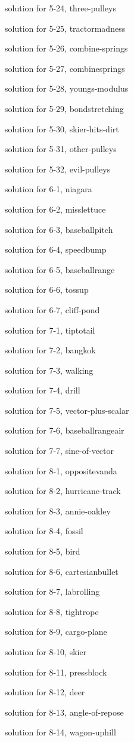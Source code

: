 \documentclass{problems}
\begin{document}
solution for 5-24, three-pulleys

solution for 5-25, tractormadness

solution for 5-26, combine-springs

solution for 5-27, combinesprings

solution for 5-28, youngs-modulus

solution for 5-29, bondstretching

solution for 5-30, skier-hits-dirt

solution for 5-31, other-pulleys

solution for 5-32, evil-pulleys

solution for 6-1, niagara

solution for 6-2, misslettuce

solution for 6-3, baseballpitch

solution for 6-4, speedbump

solution for 6-5, baseballrange

solution for 6-6, tossup

solution for 6-7, cliff-pond

solution for 7-1, tiptotail

solution for 7-2, bangkok

solution for 7-3, walking

solution for 7-4, drill

solution for 7-5, vector-plus-scalar

solution for 7-6, baseballrangeair

solution for 7-7, sine-of-vector

solution for 8-1, oppositevanda

solution for 8-2, hurricane-track

solution for 8-3, annie-oakley

solution for 8-4, fossil

solution for 8-5, bird

solution for 8-6, cartesianbullet

solution for 8-7, labrolling

solution for 8-8, tightrope

solution for 8-9, cargo-plane

solution for 8-10, skier

solution for 8-11, pressblock

solution for 8-12, deer

solution for 8-13, angle-of-repose

solution for 8-14, wagon-uphill
\end{document}
